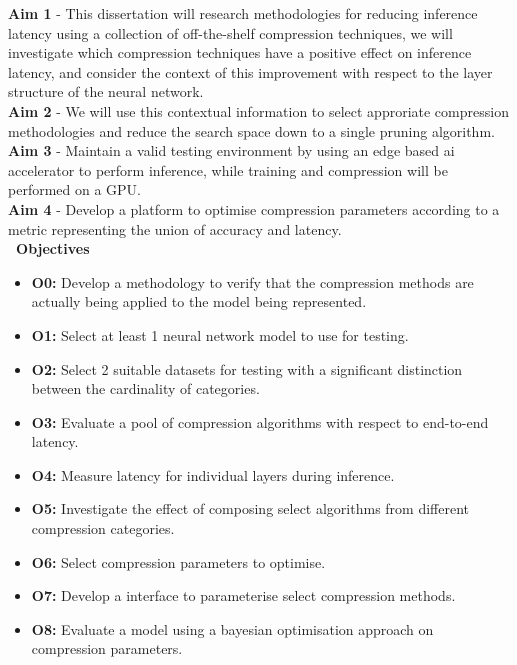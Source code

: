 \documentclass[../Dissertation.tex]{subfiles}
\begin{document}
\textbf{Aim 1}\label{Aim1} - This dissertation will research methodologies for reducing inference latency using a collection of off-the-shelf compression techniques, we will investigate which compression techniques have a positive effect on inference latency, and consider the context of this improvement with respect to the layer structure of the neural network.\\ 
\noindent\textbf{Aim 2}\label{Aim2} - We will use this contextual information to select approriate compression methodologies and reduce the search space down to a single pruning algorithm.\\
\noindent\textbf{Aim 3}\label{Aim3} - Maintain a valid testing environment by using an edge based ai accelerator to perform inference, while training and compression will be performed on a GPU.\\
\noindent\textbf{Aim 4}\label{Aim4} - Develop a platform to optimise compression parameters according to a metric representing the union of accuracy and latency.\\
\textbf{\large~Objectives}
\begin{itemize}
    \item \textbf{O0:}\label{obj:VerifyComp} Develop a methodology to verify that the compression methods are actually being applied to the model being represented.
    \item \textbf{O1:}\label{obj:ModelSel} Select at least 1 neural network model to use for testing.
    \item \textbf{O2:}\label{obj:DataSel} Select 2 suitable datasets for testing with a significant distinction between the cardinality of categories.
    \item \textbf{O3:}\label{obj:EvalE2E} Evaluate a pool of compression algorithms with respect to end-to-end latency.
    \item \textbf{O4:}\label{obj:EvalLayer} Measure latency for individual layers during inference.
    \item \textbf{O5:}\label{obj:EvalComp} Investigate the effect of composing select algorithms from different compression categories. 
    \item \textbf{O6:}\label{obj:ParaSel} Select compression parameters to optimise.
    \item \textbf{O7:}\label{obj:CompPara} Develop a interface to parameterise select compression methods.
    \item \textbf{O8:}\label{obj:TestOpt} Evaluate a model using a bayesian optimisation approach on compression parameters.
\end{itemize}
\end{document}
